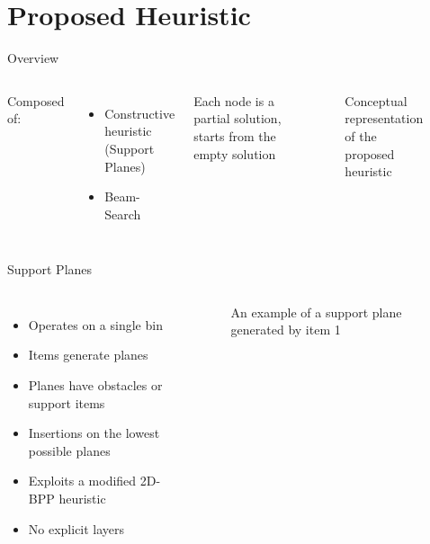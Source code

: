 \documentclass{beamer}
\begin{document}
    \section{Proposed Heuristic}
    \begin{frame}{Overview}
        \begin{columns}[onlytextwidth,T]
        \column{\dimexpr\linewidth-75mm-5mm}
        Composed of:
        \begin{itemize}
            \item Constructive heuristic (Support Planes)
            \item Beam-Search
        \end{itemize}
        Each node is a partial solution, starts from the empty solution
        \column{75mm}
            \begin{figure}[h]
                \resizebox*{!}{.6\textheight}{%
                
                }
                \caption{Conceptual representation of the proposed heuristic}
                \label{fig:heur_scheme}
            \end{figure}
        \end{columns}
    \end{frame}
    \begin{frame}{Support Planes}
        \begin{columns}[onlytextwidth,T]
            \column{\dimexpr\linewidth-65mm-5mm}
            \begin{itemize}
                \item Operates on a single bin
                \item Items generate planes
                \item Planes have obstacles or support items
                \item Insertions on the lowest possible planes
                \item Exploits a modified 2D-BPP heuristic
                \item No explicit layers
            \end{itemize}
            \column{65mm}
                \begin{figure}[h]
                    \resizebox*{\columnwidth}{!}{%
                    
                    }
                    \caption{An example of a support plane generated by item 1}
                    \label{fig:heur_scheme}
                \end{figure}
            \end{columns}
    \end{frame}
    
\end{document}
